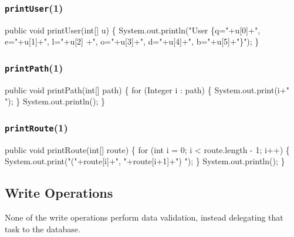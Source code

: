 \documentclass{article}
\def\nwendcode{\endtrivlist \endgroup}
\theoremstyle{definition}
\begin{document}
\subsubsection{{\tt{}\protect{}printUser}(1)}
\label{sec:print-user}
\nwenddocs{}\endmoddef{}
public void printUser(int[] u) \{
  System.out.println("User \{q="+u[0]+", e="+u[1]+", l="+u[2]
    +", o="+u[3]+", d="+u[4]+", b="+u[5]+"\}");
\}
\eatline
{}\nwendcode{}\subsubsection{{\tt{}\protect{}printPath}(1)}
\label{sec:print-paths}
\nwenddocs{}\endmoddef{}
public void printPath(int[] path) \{
  for (Integer i : path) \{
    System.out.print(i+" ");
  \}
  System.out.println();
\}
\eatline
{}\nwendcode{}\subsubsection{{\tt{}\protect{}printRoute}(1)}
\label{sec:print-routes}
\nwenddocs{}\endmoddef{}
public void printRoute(int[] route) \{
  for (int i = 0; i < route.length - 1; i++) \{
    System.out.print("("+route[i]+", "+route[i+1]+") ");
  \}
  System.out.println();
\}
\eatline
{}\nwendcode{}\subsection{Write Operations}
\label{sec:write-operations}
None of the write operations perform data validation, instead
delegating that task to the database.
\end{document}
